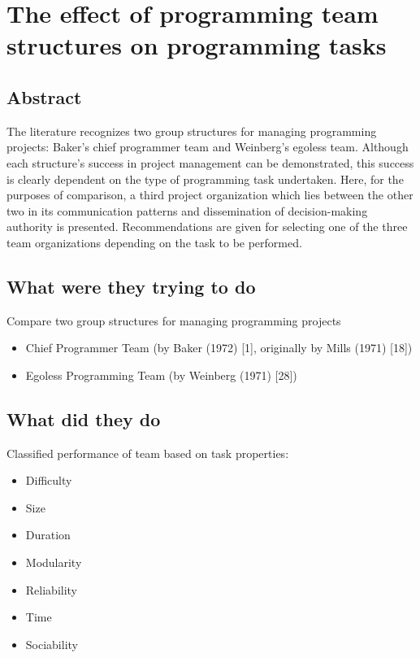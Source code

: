 \section{The effect of programming team structures on programming tasks}

\subsection{Abstract}

The literature recognizes two group structures for managing programming projects: Baker's chief programmer team and Weinberg's egoless team. Although each structure's success in project management can be demonstrated, this success is clearly dependent on the type of programming task undertaken. Here, for the purposes of comparison, a third project organization which lies between the other two in its communication patterns and dissemination of decision-making authority is presented. Recommendations are given for selecting one of the three team organizations depending on the task to be performed.

\subsection{What were they trying to do}

Compare two group structures for managing programming projects

\begin{itemize}
    \item Chief Programmer Team (by Baker (1972) [1], originally by Mills (1971) [18])
    \item Egoless Programming Team (by Weinberg (1971) [28])
\end{itemize}

\subsection{What did they do}

Classified performance of team based on task properties:

\begin{itemize}
    \item Difficulty
    \item Size
    \item Duration
    \item Modularity
    \item Reliability
    \item Time
    \item Sociability
\end{itemize}

